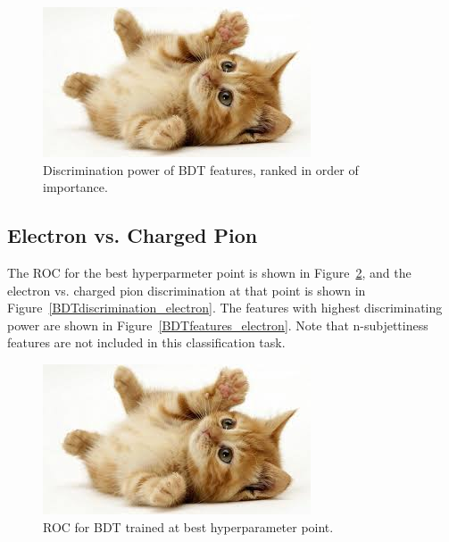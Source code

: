 \documentclass{article}
\begin{document}
    \begin{figure}
        \begin{center}
            \includegraphics{images/cat-thumb.jpeg}
        \end{center}
        \caption{Discrimination power of BDT features, ranked in order of importance.}
        \label{BDTfeatures_photon}
    \end{figure}

    \subsection*{Electron vs. Charged Pion}

    The ROC for the best hyperparmeter point is shown in Figure~\ref{BDTROC_electron}, and the electron vs. charged pion discrimination at that point is shown in Figure~\ref{BDTdiscrimination_electron}. The features with highest discriminating power are shown in Figure~\ref{BDTfeatures_electron}. Note that n-subjettiness features are not included in this classification task.

    \begin{figure}
        \begin{center}
            \includegraphics{images/cat-thumb.jpeg}
        \end{center}
        \caption{ROC for BDT trained at best hyperparameter point.}
        \label{BDTROC_electron}
    \end{figure}
\end{document}
